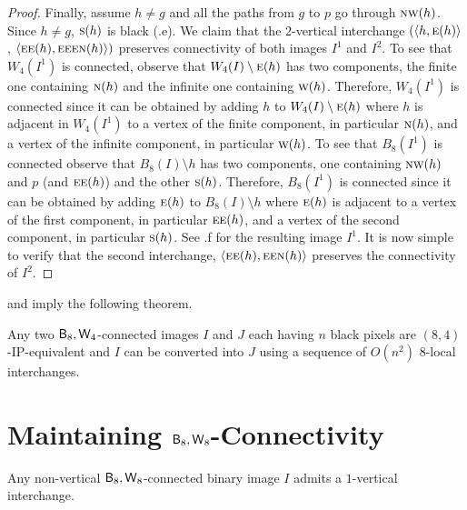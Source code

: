 \documentclass[lotsofwhite,charterfonts]{patmorin}
\newcommand{\eightfour}{\ensuremath{\protect\textup{\textsf{B}}_{8},\protect\textup{\textsf{W}}_{4}}}
\newcommand{\eighteight}{\ensuremath{\protect\textup{\textsf{B}}_{8},\protect\textup{\textsf{W}}_{8}}}
\newcommand{\N}{\textsc{n}}
\newcommand{\E}{\textsc{e}}
\renewcommand{\S}{\textsc{s}}
\newcommand{\W}{\textsc{w}}
\newcommand{\NW}{\textsc{nw}}
\newcommand{\ic}[2]{\langle #1,#2 \rangle}
\newcommand{\sm}{\ensuremath{\setminus}}
\begin{document}
\begin{proof}
Finally, assume $h\not=g$ and all the paths from $g$ to $p$ go through
$\NW(h)$. Since $h\not=g$, $\S(h)$ is black (.e).  We
claim that the $2$-vertical interchange $(\ic{h}{\E(h)}$,
$\ic{\E\E(h)}{\E\E\E\N(h)})$ preserves connectivity of both images
$I^1$ and $I^2$. To see that $W_4(I^1)$ is connected, observe that
$W_4(I)\sm \E(h)$ has two components, the finite one containing
$\N(h)$ and the infinite one containing $\W(h)$. Therefore, $W_4(I^1)$
is connected since it can be obtained by adding $h$ to $W_4(I)\sm
\E(h)$ where $h$ is adjacent in $W_4(I^1)$ to a vertex of the finite
component, in particular $\N(h)$, and a vertex of the infinite
component, in particular $\W(h)$. To see that $B_8(I^1)$ is connected
observe that $B_8(I)\sm h$ has two components, one containing $\NW(h)$
and $p$ (and $\E\E(h)$) and the other $\S(h)$. Therefore, $B_8(I^1)$
is connected since it can be obtained by adding $\E(h)$ to $B_8(I)\sm
h$ where $\E(h)$ is adjacent to a vertex of the first component, in
particular $\E\E(h)$, and a vertex of the second component, in
particular $\S(h)$. See .f for the resulting image
$I^1$. It is now simple to verify that the second interchange,
$\ic{\E\E(h)}{\E\E\N(h)}$ preserves the connectivity of $I^2$.

\end{proof}

 and  imply the following theorem.


\begin{thm}
Any two \eightfour-connected images $I$ and $J$ each having $n$ black
pixels are $(8,4)$-IP-equivalent and $I$ can be converted into $J$ using a
sequence of $O(n^2)$ 8-local interchanges.
\end{thm}



\section{Maintaining \eighteight-Connectivity}



\begin{lem} 
Any  non-vertical $\eighteight$-connected binary image $I$ admits a
$1$-vertical interchange.
\end{lem}
\end{document}
